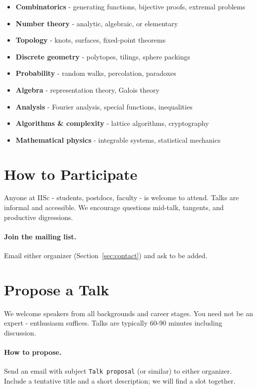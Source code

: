 \documentclass[12pt]{article}
\theoremstyle{definition}
\theoremstyle{remark}
\begin{document}
\begin{itemize}
  \item \textbf{Combinatorics} - generating functions, bijective
        proofs, extremal problems
  \item \textbf{Number theory} - analytic, algebraic, or elementary
  \item \textbf{Topology} - knots, surfaces, fixed-point theorems
  \item \textbf{Discrete geometry} - polytopes, tilings, sphere
        packings
  \item \textbf{Probability} - random walks, percolation, paradoxes
  \item \textbf{Algebra} - representation theory, Galois theory
  \item \textbf{Analysis} - Fourier analysis, special functions,
        inequalities
  \item \textbf{Algorithms \& complexity} - lattice algorithms,
        cryptography
  \item \textbf{Mathematical physics} - integrable systems,
        statistical mechanics
\end{itemize}

\section{How to Participate}

Anyone at IISc - students, postdocs, faculty - is welcome to
attend. Talks are informal and accessible. We encourage questions
mid-talk, tangents, and productive digressions.

\paragraph{Join the mailing list.}
Email either organizer (Section~\ref{sec:contact}) and ask to be
added.

\section{Propose a Talk}

We welcome speakers from all backgrounds and career stages.
You need not be an expert - enthusiasm suffices.
Talks are typically 60-90 minutes including discussion.

\paragraph{How to propose.}
Send an email with subject \texttt{Talk proposal} (or similar) to
either organizer. Include a tentative title and a short description;
we will find a slot together.
\end{document}
